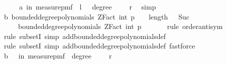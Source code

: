 \begin{isabellebody}
\ \ \isamarkupfalse%
\ \isamarkupfalse%
\ a{\isacharcolon}{\kern0pt}{\isachardoublequoteopen}{\isasymP}{\isacharparenleft}{\kern0pt}{\isasymomega}\ in\ measure{\isacharunderscore}{\kern0pt}pmf\ {\isasymOmega}{\isachardot}{\kern0pt}\ {\isacharquery}{\kern0pt}l\ {\isasymomega}\ {\isasymand}\ degree\ {\isasymomega}\ {\isasymge}\ {}{\isacharparenright}{\kern0pt}\ {\isasymle}\ {\isacharquery}{\kern0pt}r{}{\isachardoublequoteclose}\ \isamarkupfalse%
\ simp\isanewline
\isanewline
\ \ \isamarkupfalse%
\ b{}{\isacharcolon}{\kern0pt}\ {\isachardoublequoteopen}bounded{\isacharunderscore}{\kern0pt}degree{\isacharunderscore}{\kern0pt}polynomials\ {\isacharparenleft}{\kern0pt}ZFact\ {\isacharparenleft}{\kern0pt}int\ p{\isacharparenright}{\kern0pt}{\isacharparenright}{\kern0pt}\ {}\ {\isasyminter}\ {\isacharbraceleft}{\kern0pt}{\isasymomega}{\isachardot}{\kern0pt}\ length\ {\isasymomega}\ {\isasymle}\ Suc\ {}{\isacharbraceright}{\kern0pt}\isanewline
\ \ \ \ {\isacharequal}{\kern0pt}\ bounded{\isacharunderscore}{\kern0pt}degree{\isacharunderscore}{\kern0pt}polynomials\ {\isacharparenleft}{\kern0pt}ZFact\ {\isacharparenleft}{\kern0pt}int\ p{\isacharparenright}{\kern0pt}{\isacharparenright}{\kern0pt}\ {}{\isachardoublequoteclose}\isanewline
\ \ \ \ \isamarkupfalse%
\ {\isacharparenleft}{\kern0pt}rule\ order{\isacharunderscore}{\kern0pt}antisym{\isacharparenright}{\kern0pt}\isanewline
\ \ \ \ \ \isamarkupfalse%
\ {\isacharparenleft}{\kern0pt}rule\ subsetI{\isacharcomma}{\kern0pt}\ simp\ add{\isacharcolon}{\kern0pt}bounded{\isacharunderscore}{\kern0pt}degree{\isacharunderscore}{\kern0pt}polynomials{\isacharunderscore}{\kern0pt}def{\isacharparenright}{\kern0pt}\ \isanewline
\ \ \ \ \isamarkupfalse%
\ {\isacharparenleft}{\kern0pt}rule\ subsetI{\isacharcomma}{\kern0pt}\ simp\ add{\isacharcolon}{\kern0pt}bounded{\isacharunderscore}{\kern0pt}degree{\isacharunderscore}{\kern0pt}polynomials{\isacharunderscore}{\kern0pt}def{\isacharcomma}{\kern0pt}\ fastforce{\isacharparenright}{\kern0pt}\ \isanewline
\isanewline
\ \ \isamarkupfalse%
\ b{\isacharcolon}{\kern0pt}\ {\isachardoublequoteopen}\ {\isasymP}{\isacharparenleft}{\kern0pt}{\isasymomega}\ in\ measure{\isacharunderscore}{\kern0pt}pmf\ {\isasymOmega}{\isachardot}{\kern0pt}\ degree\ {\isasymomega}\ {\isacharless}{\kern0pt}\ {}{\isacharparenright}{\kern0pt}\ {\isasymle}\ {\isacharquery}{\kern0pt}r{}{\isachardoublequoteclose}\ \isanewline

\end{isabellebody}
